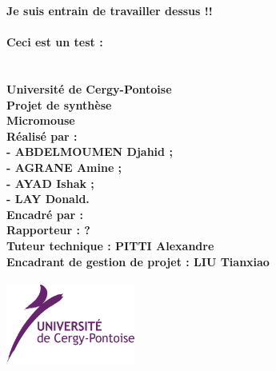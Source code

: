\thispagestyle{empty}
\begin{center}
    \large\textbf{Je suis entrain de travailler dessus !!}
    
    \paragraph{Ceci est un test :}

    \paragraph{
    \\ Université de Cergy-Pontoise
    \\ Projet de synthèse
    \\ Micromouse
    \\ Réalisé par :
    \\ - ABDELMOUMEN Djahid ;
    \\ - AGRANE Amine ;
    \\ - AYAD Ishak ;
    \\ - LAY Donald.
    \\ Encadré par :
    \\ Rapporteur : ?
    \\ Tuteur technique : PITTI Alexandre
    \\ Encadrant de gestion de projet : LIU Tianxiao
    }

    \includegraphics[height=100px]{pics/UCP-logo-violet-hd}
\end{center}